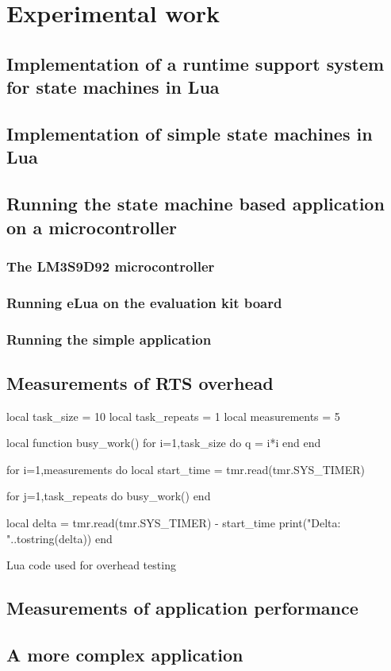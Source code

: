 \chapter{Experimental work}
\label{ch:experimental_work}

\section{Implementation of a runtime support system for state machines in Lua}
\label{sec:impl_runtime_support}

\section{Implementation of simple state machines in Lua}
\label{sec:impl_state_machines}

\section{Running the state machine based application on a microcontroller}
\label{sec:running_on_micro}

\subsection{The LM3S9D92 microcontroller}

\subsection{Running eLua on the evaluation kit board}

\subsection{Running the simple application}

\section{Measurements of RTS overhead}
\label{sec:overhead_measure}

\begin{listing}[H]
\begin{luacode}
local task_size = 10
local task_repeats = 1
local measurements = 5

local function busy_work()
	for i=1,task_size do
		q = i*i
	end
end

for i=1,measurements do
	local start_time = tmr.read(tmr.SYS_TIMER)

	for j=1,task_repeats do
		busy_work()
	end

	local delta = tmr.read(tmr.SYS_TIMER) - start_time
	print("Delta: "..tostring(delta))
end
\end{luacode}
	\caption{Lua code used for overhead testing}
	\label{code:overhead}
\end{listing}

\section{Measurements of application performance}
\label{sec:performance_measure}

\section{A more complex application}
\label{sec:impl_complex_app}
